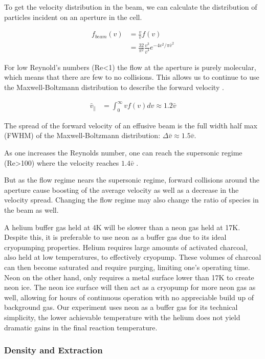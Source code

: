 \documentclass[a4paper]{article}
\begin{document}
To get the velocity distribution in the beam, we can calculate the distribution of particles incident on an aperture in the cell.

\begin{align}
f_{beam}(v) & = \frac{v}{\bar{v}}f(v)  \\
& = \frac{32}{\pi^2} \frac{v^3}{\bar{v}^4} e^{-4v^2/\pi \bar{v}^2}
\end{align}

For low Reynold's numbers (Re<1) the flow at the aperture is purely molecular, which means that there are few to no collisions. This allows us to continue to use the Maxwell-Boltzmann distribution to describe the forward velocity \cite{Hutzler2011c}.

\begin{align}
\bar{v}_\parallel & = \int_0^\infty v f(v) dv \approx 1.2 \bar{v}
\end{align}

The spread of the forward velocity of an effusive beam is the full width half max (FWHM) of the Maxwell-Boltzmann distribution: $\Delta\bar{v} \approx 1.5 \bar{v}$.

As one increases the Reynolds number, one can reach the supersonic regime (Re>100) where the velocity reaches $1.4\bar{v}$ \cite{Hutzler2011c}.

But as the flow regime nears the supersonic regime, forward collisions around the aperture cause boosting of the average velocity as well as a decrease in the velocity spread. Changing the flow regime may also change the ratio of species in the beam as well.

A helium buffer gas held at 4K will be slower than a neon gas held at 17K. Despite this, it is preferable to use neon as a buffer gas due to its ideal cryopumping properties. Helium requires large amounts of activated charcoal, also held at low temperatures, to effectively cryopump. These volumes of charcoal can then become saturated and require purging, limiting one's operating time. Neon on the other hand, only requires a metal surface lower than 17K to create neon ice. The neon ice surface will then act as a cryopump for more neon gas as well, allowing for hours of continuous operation with no appreciable build up of background gas. Our experiment uses neon as a buffer gas for its technical simplicity, the lower achievable temperature with the helium does not yield dramatic gains in the final reaction temperature.

\subsubsection{Density and Extraction}
\end{document}
